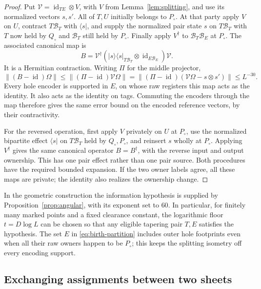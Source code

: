 \documentclass[11pt]{article}
\numberwithin{equation}{section}
\theoremstyle{definition}
\theoremstyle{remark}
\DeclareMathOperator{\id}{id}
\newcommand{\norm}[1]{\lVert #1\rVert}
\begin{document}
\begin{proof}
Put $\mathcal V=\id_{TE}\otimes V$, with $V$ from
Lemma~\ref{lem:splitting}, and use its normalized vectors $s,s'$.  All of
$T,U$ initially belongs to $P_\circ$.  At that party apply $V$ on $U$,
contract $T\mathcal B_T$ with $\langle s|$, and supply the normalized pair
state $s$ on $T\mathcal B_T$ with $T$ now held by $Q_\circ$ and
$\mathcal B_T$ still held by $P_\circ$.  Finally apply $V^{\dagger}$ to
$\mathcal B_T\mathcal B_E$ at $P_\circ$.  The associated canonical map is
\begin{equation}\label{eq:birth-map}
 B=\mathcal V^{\dagger}
       \left(|s\rangle\langle s|_{T\mathcal B_T}
                            \otimes\id_{E\mathcal B_E}\right)
          \mathcal V.
\end{equation}
It is a Hermitian contraction.  Writing $\Pi$ for the middle projector,
\[
 \norm{(B-\id)\Omega}
   \le\norm{(\Pi-\id)\mathcal V\Omega}
   =\norm{(\Pi-\id)(\mathcal V\Omega-s\otimes s')}
   \le L^{-30}.
\]
Every hole encoder is supported in $E$, on whose raw registers this map
acts as the identity.  It also acts as the identity on tags.  Commuting the
encoders through the map therefore gives the same error bound on the
encoded reference vectors, by their contractivity.

For the reversed operation, first apply $V$ privately on $U$ at
$P_\circ$, use the normalized bipartite effect $\langle s|$ on
$T\mathcal B_T$ held by $Q_\circ,P_\circ$, and reinsert $s$ wholly at
$P_\circ$.  Applying $V^{\dagger}$ gives the same canonical operator
$B=B^{\dagger}$, with the reverse input and output ownership.  This has
one pair effect rather than one pair source.  Both procedures have the
required bounded expansion.  If the two owner labels agree, all these
maps are private; the identity also realizes the ownership change.
\end{proof}

In the geometric construction the information hypothesis is supplied by
Proposition~\ref{prop:angular}, with its exponent set to $60$.  In
particular, for finitely many marked points and a fixed clearance constant,
the logarithmic floor $t=D\log L$ can be chosen so that any eligible
tapering pair $T,E$ satisfies the hypothesis.  The set $E$ in
\eqref{eq:birth-partition} includes outer hole footprints even when all
their raw owners happen to be $P_\circ$; this keeps the splitting isometry
off every encoding support.

\subsection{Exchanging assignments between two sheets}
\end{document}
